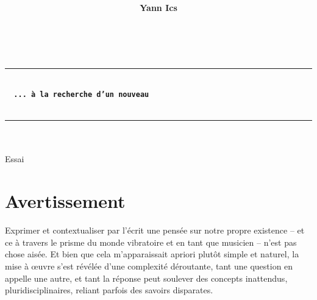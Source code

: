 \documentclass{article}
\title{
}
\author{\textsf{\textbf{Yann Ics}}}
\date{}
\begin{document}
\makeatletter
  \begin{titlepage}
  \centering
  {\Large \@author} \\
  \rule{\linewidth}{.5pt}
  \vspace{4cm}
  {\LARGE \textbf{\@title}} \\
   \vspace{6 mm}
   {\color{brown} {\Large \textbf{\texttt{\, ... à la recherche d'un nouveau}}}}\\
   \vspace{2mm}
   {}\\
  \vfill
  \rule{\linewidth}{.5pt}
     {\Large \textsf{\textsl{}}}\\ 
     {\Large \textsf{\textsl{}}}\\ 	
     {\Large \textsf{Essai}}\\
\end{titlepage}
\makeatother

\pagecolor{white}

\section*{Avertissement}

Exprimer et contextualiser par l'écrit une pensée sur notre propre existence -- et ce à travers le prisme du monde vibratoire et en tant que musicien -- n'est pas chose aisée. Et bien que cela m'apparaissait apriori plutôt simple et naturel, la mise à œuvre s'est révélée d'une complexité déroutante, tant une question en appelle une autre, et tant la réponse peut soulever des concepts inattendus, pluridisciplinaires, reliant parfois des savoirs disparates. 
\end{document}
